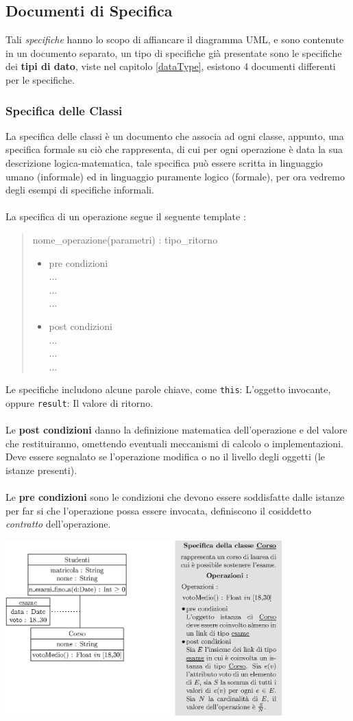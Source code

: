 \documentclass[12pt, letterpaper]{article}
\newcommand{\code}[1]{\colorbox{light-gray}{\texttt{#1}}}
\newcommand{\acc}{\\\hphantom{}\\}
\begin{document}
 \subsection{Documenti di Specifica}
Tali \textit{specifiche} hanno lo scopo di affiancare il diagramma UML, e sono contenute in un documento separato, un tipo 
di specifiche già presentate sono le specifiche dei \textbf{tipi di dato}, viste nel capitolo \ref{dataType}, esistono 
4 documenti differenti per le specifiche.
\subsubsection{Specifica delle Classi}
La specifica delle classi è un documento che associa ad ogni classe, appunto, una specifica formale su ciò che rappresenta, di cui 
per ogni operazione è data la sua descrizione logica-matematica, tale specifica può essere scritta in linguaggio 
umano (informale) ed in linguaggio puramente logico (formale), per ora vedremo degli esempi di specifiche 
informali.\acc 
La specifica di un operazione segue il seguente template : \begin{quote}
    nome\_operazione(parametri) : tipo\_ritorno\begin{itemize}
        \item pre condizioni  \\\(\dots\)\\\(\dots\)\\\(\dots\)
        \item post condizioni  \\\(\dots\)\\\(\dots\)\\\(\dots\)
    \end{itemize}
\end{quote}
Le specifiche includono alcune parole chiave, come \code{this}: L'oggetto invocante, oppure 
\code{result}: Il valore di ritorno.\acc 
Le \textbf{post condizioni} danno la definizione matematica dell'operazione e del valore che restituiranno, 
omettendo eventuali meccanismi di calcolo o implementazioni. Deve essere segnalato se l'operazione 
modifica o no il livello degli oggetti (le istanze presenti).\acc Le \textbf{pre condizioni} sono le condizioni 
che devono essere soddisfatte dalle istanze per far si che l'operazione possa essere 
invocata, definiscono il cosiddetto \textit{contratto} dell'operazione.\begin{center}
    \includegraphics[width=0.8\textwidth ]{images/specificaClassi.eps}
\end{center}
\end{document}
